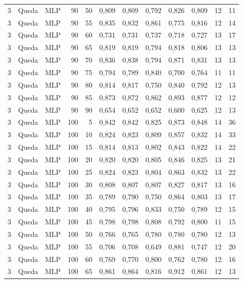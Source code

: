 \begin{longtable}{@{}rllrrrrrrrrr@{}}
3 & Queda & MLP & 90 & 50 & 0,809 & 0,809 & 0,792 & 0,826 & 0,809 & 12 & 11 \\
3 & Queda & MLP & 90 & 55 & 0,835 & 0,832 & 0,861 & 0,775 & 0,816 & 12 & 14 \\
3 & Queda & MLP & 90 & 60 & 0,731 & 0,731 & 0,737 & 0,718 & 0,727 & 13 & 17 \\
3 & Queda & MLP & 90 & 65 & 0,819 & 0,819 & 0,794 & 0,818 & 0,806 & 13 & 13 \\
3 & Queda & MLP & 90 & 70 & 0,836 & 0,838 & 0,794 & 0,871 & 0,831 & 13 & 13 \\
3 & Queda & MLP & 90 & 75 & 0,794 & 0,789 & 0,840 & 0,700 & 0,764 & 11 & 11 \\
3 & Queda & MLP & 90 & 80 & 0,814 & 0,817 & 0,750 & 0,840 & 0,792 & 12 & 13 \\
3 & Queda & MLP & 90 & 85 & 0,873 & 0,872 & 0,862 & 0,893 & 0,877 & 12 & 12 \\
3 & Queda & MLP & 90 & 90 & 0,654 & 0,652 & 0,652 & 0,600 & 0,625 & 12 & 13 \\
3 & Queda & MLP & 100 & 5 & 0,842 & 0,842 & 0,825 & 0,873 & 0,848 & 14 & 36 \\
3 & Queda & MLP & 100 & 10 & 0,824 & 0,823 & 0,809 & 0,857 & 0,832 & 14 & 33 \\
3 & Queda & MLP & 100 & 15 & 0,814 & 0,813 & 0,802 & 0,843 & 0,822 & 14 & 22 \\
3 & Queda & MLP & 100 & 20 & 0,820 & 0,820 & 0,805 & 0,846 & 0,825 & 13 & 21 \\
3 & Queda & MLP & 100 & 25 & 0,824 & 0,823 & 0,804 & 0,863 & 0,832 & 13 & 22 \\
3 & Queda & MLP & 100 & 30 & 0,808 & 0,807 & 0,807 & 0,827 & 0,817 & 13 & 16 \\
3 & Queda & MLP & 100 & 35 & 0,789 & 0,790 & 0,750 & 0,864 & 0,803 & 13 & 17 \\
3 & Queda & MLP & 100 & 40 & 0,795 & 0,796 & 0,833 & 0,750 & 0,789 & 12 & 15 \\
3 & Queda & MLP & 100 & 45 & 0,798 & 0,798 & 0,808 & 0,792 & 0,800 & 11 & 15 \\
3 & Queda & MLP & 100 & 50 & 0,766 & 0,765 & 0,780 & 0,780 & 0,780 & 12 & 13 \\
3 & Queda & MLP & 100 & 55 & 0,706 & 0,708 & 0,649 & 0,881 & 0,747 & 12 & 20 \\
3 & Queda & MLP & 100 & 60 & 0,769 & 0,770 & 0,800 & 0,762 & 0,780 & 12 & 16 \\
3 & Queda & MLP & 100 & 65 & 0,861 & 0,864 & 0,816 & 0,912 & 0,861 & 12 & 13 \\

\end{longtable}
